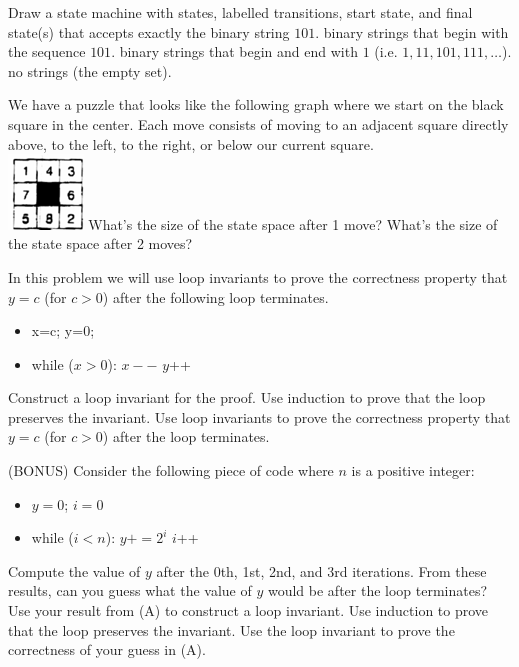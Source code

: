 \documentclass[solution, letterpaper]{cs20inclass}
\begin{document}
\pagebreak

\problem Draw a state machine with states, labelled transitions, start state, and final state(s) that accepts exactly
\subproblem the binary string $101$.
\subproblem binary strings that begin with the sequence $101$.
\subproblem binary strings that begin and end with $1$ (i.e. $1, 11, 101, 111,\ldots$).
\subproblem no strings (the empty set).

\problem We have a puzzle that looks like the following graph where we start on the black square in the center. Each move consists of moving to an adjacent square directly above, to the left, to the right, or below our current square.\\
\includegraphics[width=2cm]{initial}
\subproblem What's the size of the state space after 1 move?
\subproblem What's the size of the state space after 2 moves?

\problem In this problem we will use loop invariants to prove the correctness property that $y=c$ (for $c>0$) after the following loop terminates.
\begin{itemize}
\item x=c; y=0;
\item while ($x>0$):
\subitem $x--$
\subitem $y$++
\end{itemize}
\subproblem Construct a loop invariant for the proof.
\subproblem Use induction to prove that the loop preserves the invariant.
\subproblem Use loop invariants to prove the correctness property that $y=c$ (for $c>0$) after the loop terminates.
\pagebreak

\problem (BONUS) Consider the following piece of code where $n$ is a positive integer:
\begin{itemize}
\item $y=0$; $i=0$
\item while ($i< n$):
\subitem $y += 2^i$
\subitem $i$++
\end{itemize}
\subproblem Compute the value of $y$ after the 0th, 1st, 2nd, and 3rd iterations. From these results, can you guess what the value of $y$ would be after the loop terminates?
\subproblem Use your result from (A) to construct a loop invariant.
\subproblem Use induction to prove that the loop preserves the invariant.
\subproblem Use the loop invariant to prove the correctness of your guess in (A).
\end{document}

